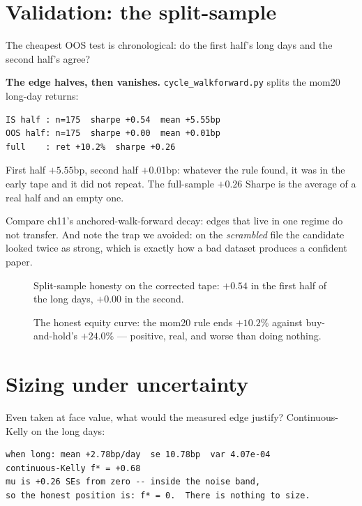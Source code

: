 \section{Validation: the split-sample}\label{sec:validate}

The cheapest OOS test is chronological: do the first half's
long days and the second half's agree?

\begin{example}\label{ex:wf17}
\textbf{The edge halves, then vanishes.}
\texttt{cycle\_walkforward.py} splits the mom20 long-day
returns:
\begin{verbatim}
IS half : n=175  sharpe +0.54  mean +5.55bp
OOS half: n=175  sharpe +0.00  mean +0.01bp
full    : ret +10.2%  sharpe +0.26
\end{verbatim}
First half $+5.55$bp, second half $+0.01$bp: whatever the rule
found, it was in the early tape and it did not repeat. The
full-sample $+0.26$ Sharpe is the average of a real half and an
empty one.
\begin{solution}
Compare ch11's anchored-walk-forward decay: edges that live in
one regime do not transfer. And note the trap we avoided: on the
\emph{scrambled} file the candidate looked twice as strong,
which is exactly how a bad dataset produces a confident paper.
\end{solution}
\end{example}

\begin{figure}[htbp]\centering

\caption{Split-sample honesty on the corrected tape: $+0.54$ in
the first half of the long days, $+0.00$ in the second.}
\label{fig:wf17}
\end{figure}

\begin{figure}[htbp]\centering

\caption{The honest equity curve: the mom20 rule ends $+10.2\%$
against buy-and-hold's $+24.0\%$ --- positive, real, and worse
than doing nothing.}
\label{fig:eq17}
\end{figure}

\section{Sizing under uncertainty}\label{sec:size17}

Even taken at face value, what would the measured edge justify?
Continuous-Kelly on the long days:

\begin{verbatim}
when long: mean +2.78bp/day  se 10.78bp  var 4.07e-04
continuous-Kelly f* = +0.68
mu is +0.26 SEs from zero -- inside the noise band,
so the honest position is: f* = 0.  There is nothing to size.
\end{verbatim}

